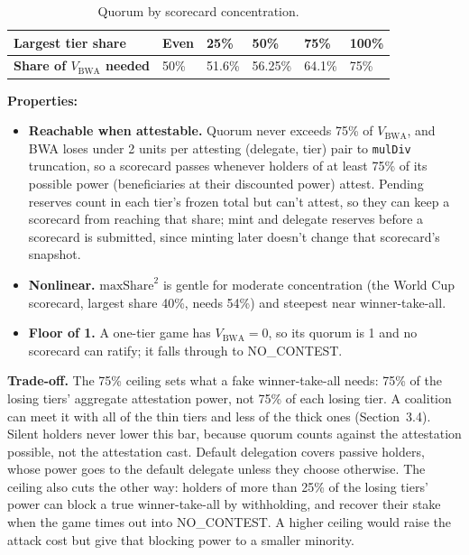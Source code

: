 \documentclass[11pt,a4paper]{article}
\begin{document}
\begin{table}[H]
\centering
\begin{tabular}{llllll}
\toprule
\textbf{Largest tier share} & Even & 25\% & 50\% & 75\% & 100\% \\
\midrule
\textbf{Share of $V_{\text{BWA}}$ needed} & 50\% & 51.6\% & 56.25\% & 64.1\% & 75\% \\
\bottomrule
\end{tabular}
\caption{Quorum by scorecard concentration.}
\end{table}

\textbf{Properties:}
\begin{itemize}[nosep]
\item \textbf{Reachable when attestable.} Quorum never exceeds 75\% of $V_{\text{BWA}}$, and BWA loses under 2 units per attesting (delegate, tier) pair to \texttt{mulDiv} truncation, so a scorecard passes whenever holders of at least 75\% of its possible power (beneficiaries at their discounted power) attest. Pending reserves count in each tier's frozen total but can't attest, so they can keep a scorecard from reaching that share; mint and delegate reserves before a scorecard is submitted, since minting later doesn't change that scorecard's snapshot.
\item \textbf{Nonlinear.} $\text{maxShare}^2$ is gentle for moderate concentration (the World Cup scorecard, largest share 40\%, needs 54\%) and steepest near winner-take-all.
\item \textbf{Floor of 1.} A one-tier game has $V_{\text{BWA}} = 0$, so its quorum is 1 and no scorecard can ratify; it falls through to NO\_CONTEST.
\end{itemize}

\textbf{Trade-off.} The 75\% ceiling sets what a fake winner-take-all needs: 75\% of the losing tiers' aggregate attestation power, not 75\% of each losing tier. A coalition can meet it with all of the thin tiers and less of the thick ones (Section~3.4). Silent holders never lower this bar, because quorum counts against the attestation possible, not the attestation cast. Default delegation covers passive holders, whose power goes to the default delegate unless they choose otherwise. The ceiling also cuts the other way: holders of more than 25\% of the losing tiers' power can block a true winner-take-all by withholding, and recover their stake when the game times out into NO\_CONTEST. A higher ceiling would raise the attack cost but give that blocking power to a smaller minority.
\end{document}
